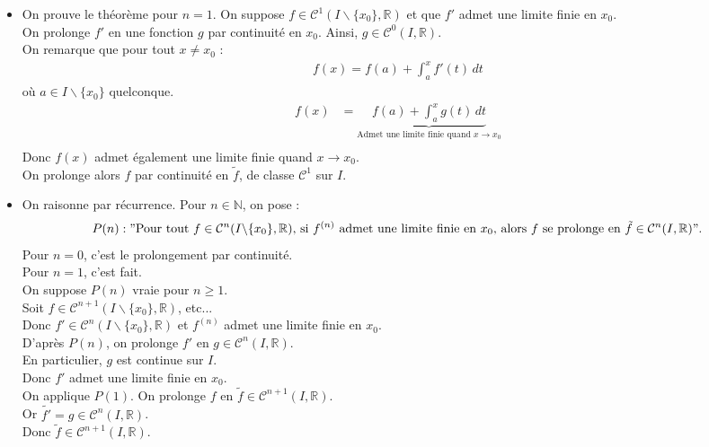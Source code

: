 \documentclass[../main.tex]{subfiles}
\begin{document}
\begin{itemize}
    \item On prouve le théorème pour $n=1$. On suppose $f \in \mathcal{C}^1(I\backslash \{x_0\}, \mathbb{R})$ et que $f'$ admet une limite finie en $x_0$. \\
    On prolonge $f'$ en une fonction $g$ par continuité en $x_0$. Ainsi, $g \in \mathcal{C}^0(I, \mathbb{R})$. \\
    On remarque que pour tout $x \neq x_0$ : 
    \begin{align*}
        f(x) = f(a) + \int_a^x f'(t) \, dt
    \end{align*}
    où $a \in I\backslash \{x_0\}$ quelconque. 
    \begin{align*}
        f(x) &= \underbrace{f(a) + \int_a^x g(t) \, dt}_{\text{Admet une limite finie quand } x\to x_0} \\
    \end{align*}
    Donc $f(x)$ admet également une limite finie quand $x\to x_0$. \\
    On prolonge alors $f$ par continuité en $\tilde{f}$, de classe $\mathcal{C}^1$ sur $I$. \\

    \item On raisonne par récurrence. Pour $n \in \mathbb{N}$, on pose : 
    \begin{align*}
        P(n) : "\text{Pour tout $f \in \mathcal{C}^n(I\backslash \{x_0\}, \mathbb{R})$, si $f^{(n)}$ admet une limite finie en $x_0$, alors $f$ se prolonge en $\tilde{f} \in \mathcal{C}^n(I, \mathbb{R})$}".
    \end{align*}
    Pour $n = 0$, c'est le prolongement par continuité. \\
    Pour $n = 1$, c'est fait. \\
    On suppose $P(n)$ vraie pour $n \geq 1$. \\
    Soit $f\in \mathcal{C}^{n+1}(I\backslash \{x_0\}, \mathbb{R})$, etc... \\
    Donc $f'\in \mathcal{C}^n(I\backslash \{x_0\}, \mathbb{R})$ et $f^{(n)}$ admet une limite finie en $x_0$. \\
    D'après $P(n)$, on prolonge $f'$ en $g\in \mathcal{C}^n(I, \mathbb{R})$. \\
    En particulier, $g$ est continue sur $I$. \\
    Donc $f'$ admet une limite finie en $x_0$. \\
    On applique $P(1)$. On prolonge $f$ en $\tilde{f}\in \mathcal{C}^{n+1}(I, \mathbb{R})$. \\
    Or $\tilde{f'} = g \in \mathcal{C}^n(I, \mathbb{R})$. \\
    Donc $\tilde f \in \mathcal{C}^{n+1}(I, \mathbb{R})$. \\
\end{itemize}
\end{document}
